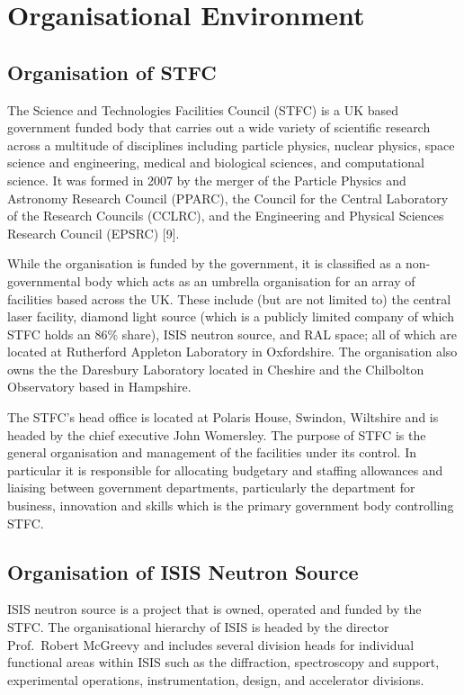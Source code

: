 \documentclass[paper=a4, fontsize=11pt]{scrartcl}	%
\numberwithin{equation}{section}															%
\numberwithin{figure}{section}																%
\numberwithin{table}{section}
\begin{document}
\clearpage
\section{Organisational Environment}\label{organisational-environment}

\subsection{Organisation of STFC}\label{organisation-of-stfc}

The Science and Technologies Facilities Council (STFC) is a UK based
government funded body that carries out a wide variety of scientific
research across a multitude of disciplines including particle physics,
nuclear physics, space science and engineering, medical and biological
sciences, and computational science. It was formed in 2007 by the merger
of the Particle Physics and Astronomy Research Council (PPARC), the
Council for the Central Laboratory of the Research Councils (CCLRC), and
the Engineering and Physical Sciences Research Council (EPSRC) {[}9{]}.

While the organisation is funded by the government, it is classified as
a non-governmental body which acts as an umbrella organisation for an
array of facilities based across the UK. These include (but are not
limited to) the central laser facility, diamond light source (which is a
publicly limited company of which STFC holds an 86\% share), ISIS
neutron source, and RAL space; all of which are located at Rutherford
Appleton Laboratory in Oxfordshire. The organisation also owns the the
Daresbury Laboratory located in Cheshire and the Chilbolton Observatory
based in Hampshire.

The STFC's head office is located at Polaris House, Swindon, Wiltshire
and is headed by the chief executive John Womersley. The purpose of STFC is
the general organisation and management of the facilities under its
control. In particular it is responsible for allocating budgetary and
staffing allowances and liaising between government departments,
particularly the department for business, innovation and skills which is
the primary government body controlling STFC.

\subsection{Organisation of ISIS Neutron
Source}\label{organisation-of-isis-neutron-source}

ISIS neutron source is a project that is owned, operated and funded by
the STFC. The organisational hierarchy of ISIS is headed by the director
Prof.~Robert McGreevy and includes several division heads for individual
functional areas within ISIS such as the diffraction, spectroscopy and
support, experimental operations, instrumentation, design, and
accelerator divisions.
\end{document}
